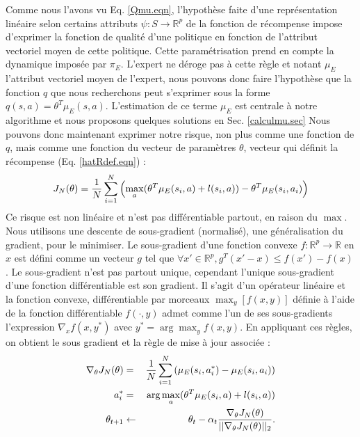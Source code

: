 \documentclass[publibook-draft]{CAp2012}
\begin{document}
Comme nous l'avons vu Eq. \eqref{Qmu.eqn}, l'hypothèse faite d'une représentation linéaire selon certains attributs $\psi : S\rightarrow \mathbb{R}^p$ de la fonction de récompense impose d'exprimer la fonction de qualité d'une politique en fonction de l'attribut vectoriel moyen de cette politique. Cette paramétrisation prend en compte la dynamique imposée par $\pi_E$. L'expert ne déroge pas à cette règle et notant $\mu_E$ l'attribut vectoriel moyen de l'expert, nous pouvons donc faire l'hypothèse que la fonction $q$ que nous recherchons peut s'exprimer sous la forme $q(s,a) = \theta^T\mu_E(s,a)$. L'estimation de ce terme $\mu_E$ est centrale à notre algorithme et nous proposons quelques solutions en Sec. \ref{calculmu.sec} Nous pouvons donc maintenant exprimer notre risque, non plus comme une fonction de $q$, mais comme une fonction du vecteur de paramètres $\theta$, vecteur qui définit la récompense (Eq. \eqref{hatRdef.eqn}) :
   \begin{equation}
     \label{structure.eqn}
   J_N(\theta)  = {1\over N} \sum_{i=1}^N\left(\max_a(\theta ^T \mu_E(s_i,a) + l(s_i,a)) - \theta ^T \mu_E(s_i,a_i) \right)
   \end{equation}
Ce risque est non linéaire et n'est pas différentiable partout, en raison du $\max$. Nous utilisons une descente de sous-gradient (normalisé), une généralisation du gradient, pour le minimiser. Le sous-gradient d'une fonction convexe $f:\mathbb{R}^p\rightarrow \mathbb{R}$ en $x$ est défini comme un vecteur $g$ tel que $\forall x' \in \mathbb{R}^p, g^T(x'-x)\leq f(x')-f(x)$. Le sous-gradient n'est pas partout unique, cependant l'unique sous-gradient d'une fonction différentiable est son gradient. Il s'agit d'un opérateur linéaire et la fonction convexe, différentiable par morceaux $\max_y[f(x,y)]$ définie à l'aide de la fonction différentiable $f(\cdot,y)$ admet comme l'un de ses sous-gradients l'expression $\nabla_xf(x,y^*)$ avec $y^*=\arg\max_yf(x,y)$. En appliquant ces règles, on obtient le sous gradient et la règle de mise à jour associée :
\begin{eqnarray}
\nabla_\theta J_N(\theta) &=& {1\over N}\sum\limits_{i=1}^N\left(\mu_E(s_i,a^*_i) - \mu_E(s_i,a_i)\right)\\
a^*_i &=& \arg\max_a(\theta ^T \mu_E(s_i,a) + l(s_i,a))\\
   \theta_{t+1} &\leftarrow& \theta_t -\alpha_t{\nabla_\theta J_N(\theta) \over ||\nabla_\theta J_N(\theta)||_2}.
\end{eqnarray}
\end{document}
